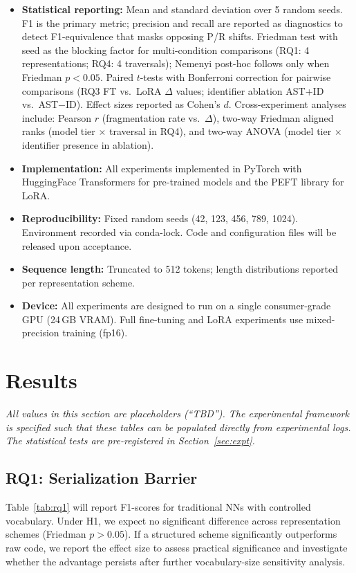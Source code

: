 \documentclass[pdflatex,sn-mathphys,Numbered]{sn-jnl}
\begin{document}
\begin{itemize}
\item \textbf{Statistical reporting:} Mean and standard deviation over 5 random seeds. F1 is the primary metric; precision and recall are reported as diagnostics to detect F1-equivalence that masks opposing P/R shifts. Friedman test with seed as the blocking factor for multi-condition comparisons (RQ1: 4 representations; RQ4: 4 traversals); Nemenyi post-hoc follows only when Friedman $p < 0.05$. Paired $t$-tests with Bonferroni correction for pairwise comparisons (RQ3 FT vs.\ LoRA $\Delta$ values; identifier ablation AST+ID vs.\ AST$-$ID). Effect sizes reported as Cohen's $d$. Cross-experiment analyses include: Pearson $r$ (fragmentation rate vs.\ $\Delta$), two-way Friedman aligned ranks (model tier $\times$ traversal in RQ4), and two-way ANOVA (model tier $\times$ identifier presence in ablation).
\item \textbf{Implementation:} All experiments implemented in PyTorch with HuggingFace Transformers for pre-trained models and the PEFT library for LoRA.
\item \textbf{Reproducibility:} Fixed random seeds (42, 123, 456, 789, 1024). Environment recorded via conda-lock. Code and configuration files will be released upon acceptance.
\item \textbf{Sequence length:} Truncated to 512 tokens; length distributions reported per representation scheme.
\item \textbf{Device:} All experiments are designed to run on a single consumer-grade GPU (24\,GB VRAM). Full fine-tuning and LoRA experiments use mixed-precision training (fp16).
\end{itemize}

\section{Results}\label{sec:results}

\textit{All values in this section are placeholders (``TBD''). The experimental framework is specified such that these tables can be populated directly from experimental logs. The statistical tests are pre-registered in Section~\ref{sec:expt}.}

\subsection{RQ1: Serialization Barrier}

Table~\ref{tab:rq1} will report F1-scores for traditional NNs with controlled vocabulary. Under H1, we expect no significant difference across representation schemes (Friedman $p > 0.05$). If a structured scheme significantly outperforms raw code, we report the effect size to assess practical significance and investigate whether the advantage persists after further vocabulary-size sensitivity analysis.
\end{document}
